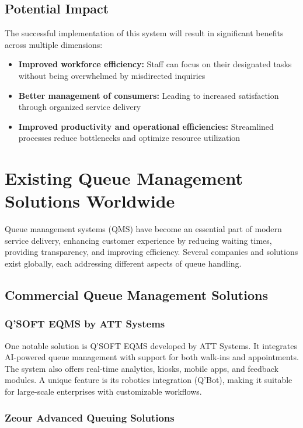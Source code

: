 \documentclass[12pt,a4paper]{report}
\begin{document}
\section{Potential Impact}

The successful implementation of this system will result in significant benefits across multiple dimensions:

\begin{itemize}
    \item \textbf{Improved workforce efficiency:} Staff can focus on their designated tasks without being overwhelmed by misdirected inquiries
    \item \textbf{Better management of consumers:} Leading to increased satisfaction through organized service delivery
    \item \textbf{Improved productivity and operational efficiencies:} Streamlined processes reduce bottlenecks and optimize resource utilization
\end{itemize}

\newpage
\chapter{Existing Queue Management Solutions Worldwide}

Queue management systems (QMS) have become an essential part of modern service delivery, enhancing customer experience by reducing waiting times, providing transparency, and improving efficiency. Several companies and solutions exist globally, each addressing different aspects of queue handling.

\section{Commercial Queue Management Solutions}

\subsection{Q'SOFT EQMS by ATT Systems}

One notable solution is Q'SOFT EQMS developed by ATT Systems. It integrates AI-powered queue management with support for both walk-ins and appointments. The system also offers real-time analytics, kiosks, mobile apps, and feedback modules. A unique feature is its robotics integration (Q'Bot), making it suitable for large-scale enterprises with customizable workflows.

\subsection{Zeour Advanced Queuing Solutions}
\end{document}
